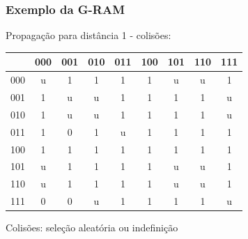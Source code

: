 \documentclass{beamer}
\begin{document}
\begin{frame}
    \frametitle{Exemplo da G-RAM}
    Propagação para distância 1 - colisões:

    \begin{table}
        \centering
        \begin{tabular}{|c|c|c|c|c|c|c|c|c|}
            \hline
                &       000 &       001 &       010 &       011 &       100 &       101 &       110 &       111\\
            \hline
            000 &        u  &        1  &        1  &        1  &        1  &        u  &        u  &        1 \\
            \hline
            001 &        1  &        u  &        u  &        1  &        1  &        1  &        1  &        u \\
            \hline
            010 &        1  &        u  &        u  &        1  &        1  &        1  &        1  &        u \\
            \hline
            011 &        1  & \alert 0  &        1  &        u  &        1  &        1  &        1  &        1 \\
            \hline
            100 &        1  &        1  &        1  &        1  &        1  &        1  &        1  &        1 \\
            \hline
            101 &        u  & \alert 1  &        1  &        1  &        1  &        u  &        u  &        1 \\
            \hline
            110 &        u  & \alert 1  &        1  &        1  &        1  &        u  &        u  &        1 \\
            \hline
            111 & \alert 0  &        0  &        u  & \alert 1  &        1  & \alert 1  &        1  &        u \\
            \hline

        \end{tabular}
    \end{table}
    Colisões: seleção aleatória ou indefinição
\end{frame}
\end{document}
